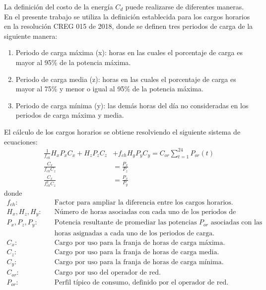 La definición del costo de la energía $C_d$ puede realizarse de diferentes maneras. En el presente trabajo se utiliza la definición establecida para los cargos horarios en la resolución CREG 015 de 2018, donde se definen tres periodos de carga de la siguiente manera:
\begin{enumerate}
	\item Periodo de carga máxima (x): horas en las cuales el porcentaje de carga es mayor al 95\% de la potencia máxima.
	\item Periodo de carga media (z): horas en las cuales el porcentaje de carga es mayor al 75\% y menor o igual al 95\% de la potencia máxima.
	\item Periodo de carga mínima (y): las demás horas del día no consideradas en los periodos de carga máxima y media.
\end{enumerate}
El cálculo de los cargos horarios se obtiene resolviendo el siguiente sistema de ecuaciones:
\begin{subequations}
\begin{align}
	\frac{1}{f_{ch}} H_x P_x C_x + H_z P_z C_z &+ f_{ch} H_y P_y C_y = C_{or} \sum_{t=1}^{24} P_{or}(t)\\
	\frac{C_x}{f_{ch} C_z} &= \frac{P_x}{P_z}\\	
	\frac{C_x}{f_{ch}^2 C_z} &= \frac{P_x}{P_y}
\end{align}\label{eq:price_creg}
\end{subequations}
donde
\begin{align*}
	f_{ch}: \quad & \text{Factor para ampliar la diferencia entre los cargos horarios.}\\
	H_x, H_z, H_y: \quad & \text{Número de horas asociadas con cada uno de los periodos de carga.}\\
	P_x, P_z, P_y: \quad & \text{Potencia resultante de promediar las potencias $P_{or}$ asociadas con las}\\
	& \text{horas asignadas a cada uno de los periodos de carga.}\\
	C_x: \quad & \text{Cargo por uso para la franja de horas de carga máxima.}\\
	C_z: \quad & \text{Cargo por uso para la franja de horas de carga media.}\\
	C_y: \quad & \text{Cargo por uso para la franja de horas de carga mínima.}\\
	C_{or}: \quad & \text{Cargo por uso del operador de red.}\\
	P_{or}: \quad & \text{Perfil típico de consumo, definido por el operador de red.}
\end{align*}

